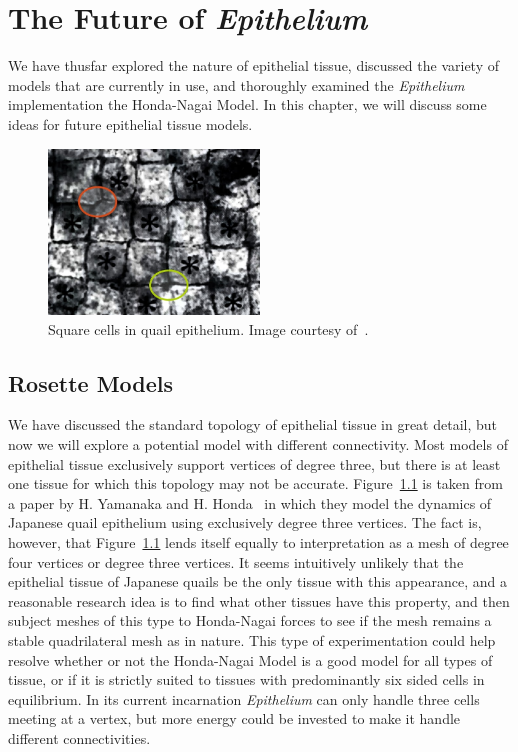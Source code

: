 \chapter{The Future of \emph{Epithelium}}
\label{chap:advances}

We have thusfar explored the nature of epithelial tissue, discussed the variety of models that are currently in use, and thoroughly examined the \emph{Epithelium} implementation the Honda-Nagai Model. In this chapter, we will discuss some ideas for future epithelial tissue models. 

\begin{figure}[hb]
\centering
\includegraphics[width=0.5\textwidth]{../diagrams/checkers.jpg}
\caption{Square cells in quail epithelium. Image courtesy of~\cite{Checkers}.}
\label{fig:quail}
\end{figure}

\section{Rosette Models}
We have discussed the standard topology of epithelial tissue in great detail, but now we will explore a potential model with different connectivity. Most models of epithelial tissue exclusively support vertices of degree three, but there is at least one tissue for which this topology may not be accurate. Figure~\ref{fig:quail} is taken from a paper by H. Yamanaka and H. Honda~\cite{Checkers} in which they model the dynamics of Japanese quail epithelium using exclusively degree three vertices. The fact is, however, that Figure~\ref{fig:quail} lends itself equally to interpretation as a mesh of degree four vertices or degree three vertices. It seems intuitively unlikely that the epithelial tissue of Japanese quails be the only tissue with this appearance, and a reasonable research idea is to find what other tissues have this property, and then subject meshes of this type to Honda-Nagai forces to see if the mesh remains a stable quadrilateral mesh as in nature. This type of experimentation could help resolve whether or not the Honda-Nagai Model is a good model for all types of tissue, or if it is strictly suited to tissues with predominantly six sided cells in equilibrium. In its current incarnation \emph{Epithelium} can only handle three cells meeting at a vertex, but more energy could be invested to make it handle different connectivities.

